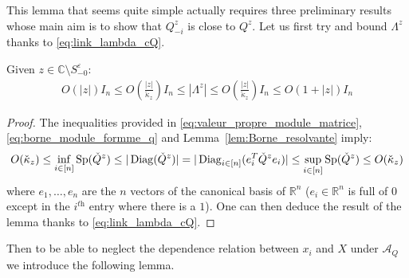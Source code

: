 \documentclass[a4papaer, titlepage]{book}
\begin{document}
This lemma that seems quite simple actually requires three preliminary results whose main aim is to show that $Q_{-i}^z$ is close to $Q^z$.
Let us first try and bound $\Lambda^z$ thanks to \eqref{eq:link_lambda_cQ}.
\begin{lemma}\label{lem:Borne_Lambda}
  Given $z \in \mathbb C \setminus S_{-0}^\varepsilon$: %
  \begin{align*}
    O \left(|z|\right) I_n \leq O \left(\frac{|z|}{\check \kappa_z}\right) I_n\leq  \left\vert \Lambda^z \right\vert\leq  O \left(\frac{|z|}{\check \kappa_z}\right) I_n\leq O \left(1 +|z|\right)I_n
 \end{align*}
  
\end{lemma}
\begin{proof}%
The inequalities provided in \eqref{eq:valeur_propre_module_matrice}, \eqref{eq:borne_module_formme_q} and Lemma~\ref{lem:Borne_resolvante} imply:
  \begin{align*}
    O(\check \kappa_z)\leq \inf_{i\in [n]} \operatorname{Sp}(\check Q^z) \leq |\operatorname{Diag}(\check Q^z) | = |\operatorname{Diag}_{i \in [n]}(e_i^T \check Q^ze_i) | \leq \sup_{i\in [n]} \operatorname{Sp}(\check Q^z) \leq O(\check \kappa_z)
  \end{align*}
  where $e_1,\ldots, e_n$ are the $n$ vectors of the canonical basis of $\mathbb R^n$ ($e_i \in \mathbb R^n$ is full of $0$ except in the $i ^{\textit{th}}$ entry where there is a $1$). One can then deduce the result of the lemma thanks to \eqref{eq:link_lambda_cQ}.
\end{proof}
Then to be able to neglect the dependence relation between $x_i$ and $X$ under $\mathcal A_Q$ we introduce the following lemma.
\end{document}

